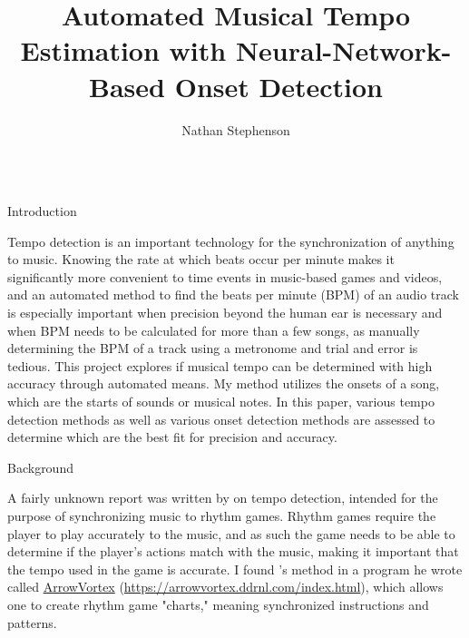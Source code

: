 \documentclass[xcolor={table,xdraw}]{beamer}       %
\title[]{\huge Automated Musical Tempo Estimation with Neural-Network-Based Onset Detection}
\subtitle{}
\author[Stephenson]{\Large Nathan Stephenson}
\institute[TJHSST]
{
  \large TJHSST Computer Systems Lab, 2020--2021
}
\date[]{}
\begin{document}
\begin{frame}
  \maketitle
  \begin{columns}


    \begin{column}{0.33\textwidth}
      \begin{block}{Introduction} \label{sec:intro}  
        \setlength{\parindent}{1em}
        
        Tempo detection is an important technology for the synchronization of
        anything to music. Knowing the rate at which beats occur per minute
        makes it significantly more convenient to time events in music-based
        games and videos, and an automated method to find the beats per minute
        (BPM) of an audio track is especially important when precision beyond
        the human ear is necessary and when BPM needs to be calculated for more
        than a few songs, as manually determining the BPM of a track using a
        metronome and trial and error is tedious. This project explores if
        musical tempo can be determined with high accuracy through automated
        means. My method utilizes the onsets of a song, which are the starts
        of sounds or musical notes. In this paper, various tempo detection
        methods as well as various onset detection methods are assessed to
        determine which are the best fit for precision and accuracy.

      \end{block}

      \begin{block}{Background}
        \setlength{\parindent}{1em}

        \label{sec:background} A fairly unknown report was written by
        \citeauthor*{bram} \cite{bram} on tempo detection, intended for the
        purpose of synchronizing music to rhythm games. Rhythm games require the
        player to play accurately to the music, and as such the game needs to be
        able to determine if the player’s actions match with the music, making
        it important that the tempo used in the game is accurate. I found
        \citeauthor*{bram}’s method in a program he wrote called
        \href{https://arrowvortex.ddrnl.com/index.html}{ArrowVortex}
        (\url{https://arrowvortex.ddrnl.com/index.html}), which allows one to
        create rhythm game "charts," meaning synchronized instructions and
        patterns.


\end{block}
\end{column}
\end{columns}
\end{frame}
\end{document}
